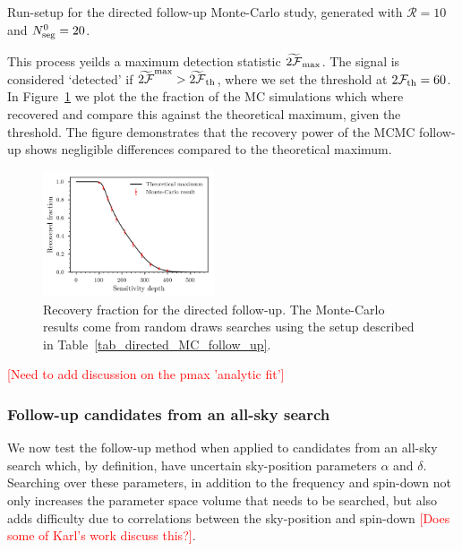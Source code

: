 \documentclass[aps, prd, twocolumn, superscriptaddress, floatfix, showpacs, nofootinbib, longbibliography]{revtex4-1}
\newcommand{\comment}[1]{\textcolor{red}{[#1]}}
\begin{document}
\begin{table}[htb]
\caption{Run-setup for the directed follow-up Monte-Carlo study, generated with
$\mathcal{R}=10$ and $N_{\rm seg}^0=20$.}
\label{tab_directed_MC_follow_up}

\end{table}

This process yeilds a maximum detection statistic $\widetilde{2{\mathcal{F}}}_{\rm max}$.
The signal is considered `detected' if $\widetilde{2{\mathcal{F}}}^{\rm max} >
\widetilde{2{\mathcal{F}}}_{\rm th}$, where we set the threshold at $2{\mathcal{F}}_{\rm th}=60$. In
Figure~\ref{fig_directed_MC_follow_up} we plot the the fraction of the MC
simulations which where recovered and compare this against the theoretical
maximum, given the threshold. The figure demonstrates that the recovery power
of the MCMC follow-up shows negligible differences compared to the
theoretical maximum.

\begin{figure}[htb]
\centering
\includegraphics[width=0.45\textwidth]{directed_recovery}
\caption{Recovery fraction for the directed follow-up. The Monte-Carlo results
come from random draws searches using the setup described in
Table~\ref{tab_directed_MC_follow_up}.}
\label{fig_directed_MC_follow_up}
\end{figure}

\comment{Need to add discussion on the pmax 'analytic fit'}

\subsubsection{Follow-up candidates from an all-sky search}
\label{sec_all_sky_follow_up}

We now test the follow-up method when applied to candidates from an all-sky
search which, by definition, have uncertain sky-position parameters $\alpha$
and $\delta$. Searching over these parameters, in addition to the frequency
and spin-down not only increases the parameter space volume that needs to be
searched, but also adds difficulty due to correlations between the sky-position
and spin-down \comment{Does some of Karl's work discuss this?}.
\end{document}

